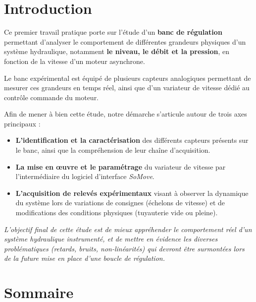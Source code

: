 \documentclass[12pt,a4paper]{article}
\begin{document}
\clearpage
{}


\section*{Introduction}

Ce premier travail pratique porte sur l’étude d’un \textbf{banc de régulation} permettant d’analyser le comportement de différentes grandeurs physiques d’un système hydraulique, notamment \textbf{le niveau, le débit et la pression}, en fonction de la vitesse d’un moteur asynchrone.

Le banc expérimental est équipé de plusieurs capteurs analogiques permettant de mesurer ces grandeurs en temps réel, ainsi que d’un variateur de vitesse dédié au contrôle commande du moteur.

Afin de mener à bien cette étude, notre démarche s'articule autour de trois axes principaux :
\begin{itemize}
    \item \textbf{L'identification et la caractérisation} des différents capteurs présents sur le banc, ainsi que la compréhension de leur chaîne d’acquisition.
    \item \textbf{La mise en œuvre et le paramétrage} du variateur de vitesse par l'intermédiaire du logiciel d'interface \textit{SoMove}.
    \item \textbf{L'acquisition de relevés expérimentaux} visant à observer la dynamique du système lors de variations de consignes (échelons de vitesse) et de modifications des conditions physiques (tuyauterie vide ou pleine).
\end{itemize}

\vspace{0.5cm}
\noindent \textit{L'objectif final de cette étude est de mieux appréhender le comportement réel d’un système hydraulique instrumenté, et de mettre en évidence les diverses problématiques (retards, bruits, non-linéarités) qui devront être surmontées lors de la future mise en place d'une boucle de régulation.}

\clearpage


\section*{Sommaire}
\tableofcontents
\end{document}
